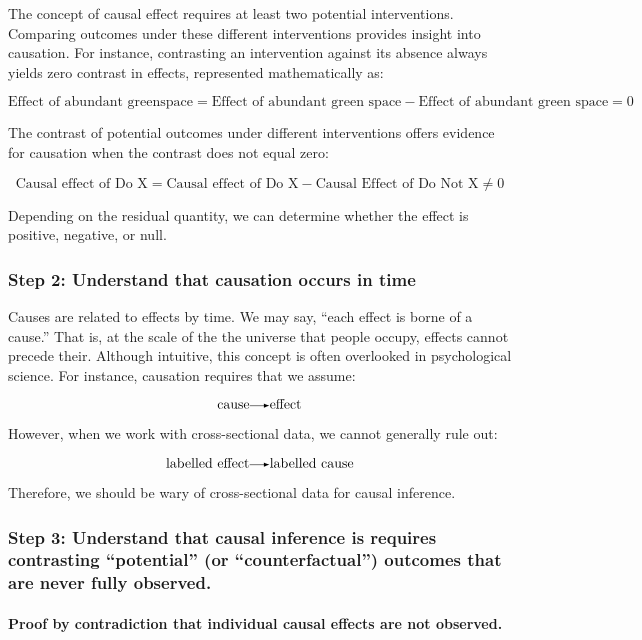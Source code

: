 \documentclass[
  singlecolumn]{article}
\let\oldparagraph\paragraph
\renewcommand{\paragraph}[1]{\oldparagraph{#1}\mbox{}}
\renewcommand{\rightarrow}{\tikz[baseline=-0.5ex] \draw[-latex] (0,0) -- (0.5,0);}
\renewcommand{\to}{\rightarrow}
\begin{document}
The concept of causal effect requires at least two potential
interventions. Comparing outcomes under these different interventions
provides insight into causation. For instance, contrasting an
intervention against its absence always yields zero contrast in effects,
represented mathematically as:

\[
\text{Effect of abundant greenspace} = \text{Effect of abundant green space} - \text{Effect of abundant green space} = 0
\]

The contrast of potential outcomes under different interventions offers
evidence for causation when the contrast does not equal zero:

\[
\text{Causal effect of Do X} = \text{Causal effect of Do  X} - \text{Causal Effect of Do Not X} \neq 0
\]

Depending on the residual quantity, we can determine whether the effect
is positive, negative, or null.

\subsubsection{Step 2: Understand that causation occurs in
time}\label{step-2-understand-that-causation-occurs-in-time}

Causes are related to effects by time. We may say, ``each effect is
borne of a cause.'' That is, at the scale of the the universe that
people occupy, effects cannot precede their. Although intuitive, this
concept is often overlooked in psychological science. For instance,
causation requires that we assume:

\[
\text{cause} \to \text{effect}
\]

However, when we work with cross-sectional data, we cannot generally
rule out:

\[
\text{labelled effect} \to \text{labelled cause}
\]

Therefore, we should be wary of cross-sectional data for causal
inference.

\subsubsection{Step 3: Understand that causal inference is requires
contrasting ``potential'' (or ``counterfactual'') outcomes that are
never fully
observed.}\label{step-3-understand-that-causal-inference-is-requires-contrasting-potential-or-counterfactual-outcomes-that-are-never-fully-observed.}

\paragraph{\texorpdfstring{\textbf{Proof by contradiction that
individual causal effects are not
observed.}}{Proof by contradiction that individual causal effects are not observed.}}\label{proof-by-contradiction-that-individual-causal-effects-are-not-observed.}
\end{document}
